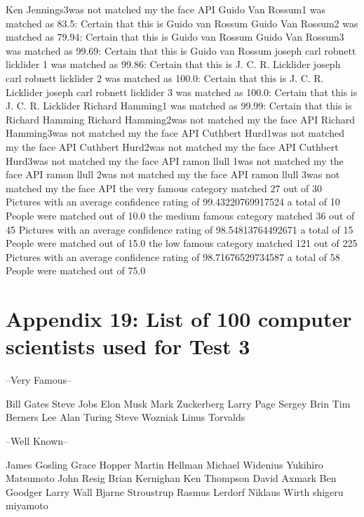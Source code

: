 \documentclass[12pt,a4paper]{article}
\begin{document}
\begin{appendices}
Ken Jennings3was not matched my the face API
Guido Van Rossum1 was matched as 83.5: Certain that this is Guido van Rossum
Guido Van Rossum2 was matched as 79.94: Certain that this is Guido van Rossum
Guido Van Rossum3 was matched as 99.69: Certain that this is Guido van Rossum
joseph carl robnett licklider 1 was matched as 99.86: Certain that this is J. C. R. Licklider
joseph carl robnett licklider 2 was matched as 100.0: Certain that this is J. C. R. Licklider
joseph carl robnett licklider 3 was matched as 100.0: Certain that this is J. C. R. Licklider
Richard Hamming1 was matched as 99.99: Certain that this is Richard Hamming
Richard Hamming2was not matched my the face API
Richard Hamming3was not matched my the face API
Cuthbert Hurd1was not matched my the face API
Cuthbert Hurd2was not matched my the face API
Cuthbert Hurd3was not matched my the face API
ramon llull 1was not matched my the face API
ramon llull 2was not matched my the face API
ramon llull 3was not matched my the face API
the very famous category matched 27 out of 30 Pictures with an average confidence rating of 99.43220769917524
a total of 10 People were matched out of 10.0
the medium famous category matched 36 out of 45 Pictures with an average confidence rating of 98.54813764492671
a total of 15 People were matched out of 15.0
the low famous category matched 121 out of 225 Pictures with an average confidence rating of 98.71676529734587
a total of 58 People were matched out of 75.0
\section{Appendix 19: List of 100 computer scientists used for Test 3}
--Very Famous--

  Bill Gates 
  Steve Jobs 
  Elon Musk 
  Mark Zuckerberg 
  Larry Page  
  Sergey Brin 
  Tim Berners Lee 
  Alan Turing 
  Steve Wozniak 
  Linus Torvalds

  --Well Known--

  James Gosling 
  Grace Hopper 
  Martin Hellman 
  Michael Widenius 
  Yukihiro Matsumoto 
  John Resig 
  Brian Kernighan 
  Ken Thompson 
  David Axmark 
  Ben Goodger 
  Larry Wall 
  Bjarne Stroustrup 
  Rasmus Lerdorf 
  Niklaus Wirth 
  shigeru miyamoto 


\end{appendices}
\end{document}
